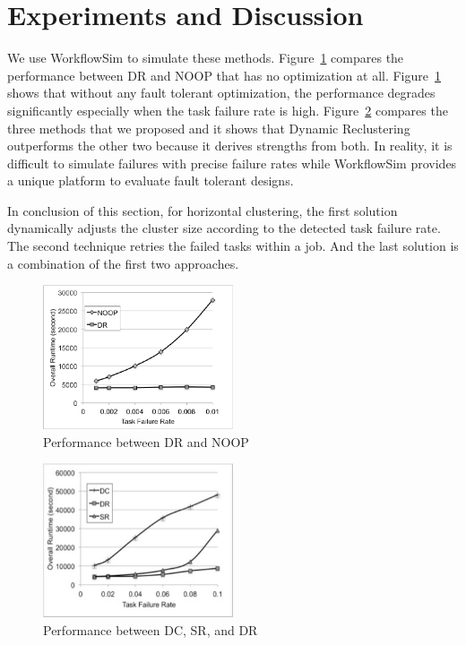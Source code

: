 \section{Experiments and Discussion}

We use WorkflowSim \cite{WorkflowSim} to simulate these methods. Figure~\ref{fig:ftc_performance_1} compares the performance between DR and NOOP that has no optimization at all. Figure~\ref{fig:ftc_performance_1} shows that without any fault tolerant optimization, the performance degrades significantly especially when the task failure rate is high. Figure~\ref{fig:ftc_performance_2} compares the three methods that we proposed and it shows that Dynamic Reclustering outperforms the other two because it derives strengths from both. In reality, it is difficult to simulate failures with precise failure rates while WorkflowSim provides a unique platform to evaluate fault tolerant designs.

In conclusion of this section, for horizontal clustering, the first solution dynamically adjusts the cluster size according to the detected task failure rate. The second technique retries the failed tasks within a job. And the last solution is a combination of the first two approaches. 
\begin{figure}[!ht]
	\centering
    \includegraphics[width=0.5\textwidth]{figures/tolerance/ftc_performance_1.pdf}
    \caption{Performance between DR and NOOP}
    \label{fig:ftc_performance_1}
\end{figure}

\begin{figure}[!ht]
	\centering
    \includegraphics[width=0.5\textwidth]{figures/tolerance/ftc_performance_2.pdf}
    \caption{Performance between DC, SR, and DR}
    \label{fig:ftc_performance_2}
\end{figure}

